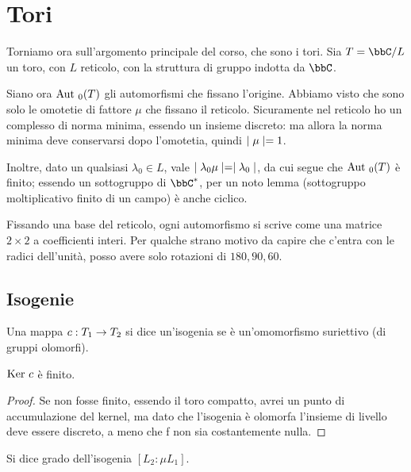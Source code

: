 	
	\section{Tori}
	
	Torniamo ora sull'argomento principale del corso, che sono i tori. Sia $T = \bbC / L$ un toro, con $L$ reticolo, con la struttura di gruppo indotta da $\bbC$.
	
	Siano ora $\text{Aut }_0(T)$ gli automorfismi che fissano l'origine. Abbiamo visto che sono solo le omotetie di fattore $\mu$ che fissano il reticolo. Sicuramente nel reticolo ho un complesso di norma minima, essendo un insieme discreto: ma allora la norma minima deve conservarsi dopo l'omotetia, quindi $\mid \mu \mid=1$.
	
	Inoltre, dato un qualsiasi $\lambda_0 \in L$, vale $\mid \lambda_0 \mu \mid = \mid \lambda_0 \mid$, da cui segue che $\text{Aut }_0(T)$ è finito; essendo un sottogruppo di $\bbC^*$, per un noto lemma (sottogruppo moltiplicativo finito di un campo) è anche ciclico.
	
	Fissando una base del reticolo, ogni automorfismo si scrive come una matrice $2 \times 2$ a coefficienti interi. Per qualche strano motivo da capire che c'entra con le radici dell'unità, %
	posso avere solo rotazioni di $180, 90, 60$.
	
	\subsection{Isogenie}
	\begin{definizione}
		Una mappa $c: T_1 \rightarrow T_2$ si dice un'isogenia se è un'omomorfismo suriettivo (di gruppi olomorfi).
	\end{definizione}
	
	\begin{proposizione}
		$\mbox{Ker } c$ è finito.
	\end{proposizione}
	\begin{proof}
		Se non fosse finito, essendo il toro compatto, avrei un punto di accumulazione del kernel, ma dato che l'isogenia è olomorfa l'insieme di livello deve essere discreto, a meno che f non sia costantemente nulla.
	\end{proof}
	
	\begin{definizione}
		Si dice grado dell'isogenia $[L_2 : \mu L_1]$.
        \end{definizione}
              
